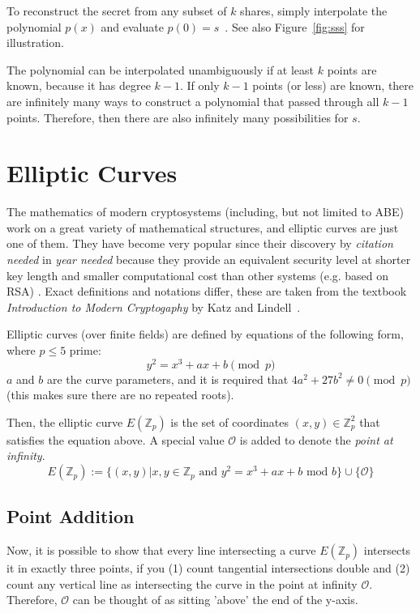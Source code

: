 To reconstruct the secret from any subset of $k$ shares, simply interpolate the polynomial $p(x)$ and evaluate $p(0) = s$~\cite{shamir_how_1979}.
See also Figure~\ref{fig:sss} for illustration.

The polynomial can be interpolated unambiguously if at least $k$ points are known, because it has degree $k-1$.
If only $k-1$ points (or less) are known, there are infinitely many ways to construct a polynomial that passed through all $k-1$ points.
Therefore, then there are also infinitely many possibilities for $s$.~\cite{shamir_how_1979}



\section{Elliptic Curves}

The mathematics of modern cryptosystems (including, but not limited to ABE) work on a great variety of mathematical structures, and elliptic curves are just one of them.
They have become very popular since their discovery by \emph{citation needed} in \emph{year needed} because they provide an equivalent security level at shorter key length and smaller computational cost than other systems (e.g. based on RSA) \cite{katz_introduction_2015}.
Exact definitions and notations differ, these are taken from the textbook \emph{Introduction to Modern Cryptogaphy} by Katz and Lindell~\cite{katz_introduction_2015}.

Elliptic curves (over finite fields) are defined by equations of the following form, where $p \leq 5$ prime: \cite{katz_introduction_2015}
\begin{equation}
    y^2 = x^3 + a x + b \pmod{p}
\end{equation}
$a$ and $b$ are the curve parameters, and it is required that $4a^2 + 27b^2 \neq 0 \pmod{p}$ (this makes sure there are no repeated roots).\cite{katz_introduction_2015}

Then, the elliptic curve $E(\mathbb{Z}_p)$ is the set of coordinates $(x, y) \in \mathbb{Z}_p^2$ that satisfies the equation above. 
A special value $\mathcal{O}$ is added to denote the \emph{point at infinity}. \cite{katz_introduction_2015}
\begin{equation}
    E(\mathbb{Z}_p) := \{(x, y) | x,y \in \mathbb{Z}_p \text{ and } y^2 = x^3 + a x + b \text{ mod } b\} \cup \{\mathcal{O}\}
\end{equation}

\subsection{Point Addition}
Now, it is possible to show that every line intersecting a curve $E(\mathbb{Z}_p)$ intersects it in exactly three points, if you (1) count tangential intersections double and (2) count any vertical line as intersecting the curve in the point at infinity $\mathcal{O}$.
Therefore, $\mathcal{O}$ can be thought of as sitting 'above' the end of the y-axis.\cite{katz_introduction_2015}

